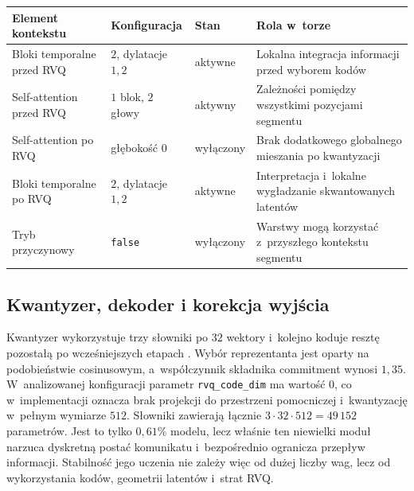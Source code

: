 \begin{center}
\centering
\small
\setlength{\tabcolsep}{4pt}
\begin{tabular}{>{\raggedright\arraybackslash}p{} >{\raggedright\arraybackslash}p{} >{\raggedright\arraybackslash}p{} >{\raggedright\arraybackslash}p{}}
\toprule
Element kontekstu & Konfiguracja & Stan & Rola w~torze \\
\midrule
Bloki temporalne przed RVQ & \(2\), dylatacje \(1,2\) & aktywne & Lokalna integracja informacji przed wyborem kodów \\
Self-attention przed RVQ & \(1\) blok, \(2\) głowy & aktywny & Zależności pomiędzy wszystkimi pozycjami segmentu \\
Self-attention po RVQ & głębokość \(0\) & wyłączony & Brak dodatkowego globalnego mieszania po kwantyzacji \\
Bloki temporalne po RVQ & \(2\), dylatacje \(1,2\) & aktywne & Interpretacja i~lokalne wygładzanie skwantowanych latentów \\
Tryb przyczynowy & \texttt{false} & wyłączony & Warstwy mogą korzystać z~przyszłego kontekstu segmentu \\
\bottomrule
\end{tabular}
\label{tab:kontekst-aktywnego-modelu}
\end{center}

\subsection{Kwantyzer, dekoder i korekcja wyjścia}
\label{subsec:kwantyzer-dekoder-korekcja}

Kwantyzer wykorzystuje trzy słowniki po \(32\) wektory i~kolejno koduje resztę pozostałą po wcześniejszych etapach \cite{Gray1984VectorQuantization,VanDenOord2017NeuralDiscrete,Zeghidour2021SoundStream}. Wybór reprezentanta jest oparty na podobieństwie cosinusowym, a~współczynnik składnika commitment wynosi \(1{,}35\). W~analizowanej konfiguracji parametr \texttt{rvq\_code\_dim} ma wartość \(0\), co w~implementacji oznacza brak projekcji do przestrzeni pomocniczej i~kwantyzację w~pełnym wymiarze \(512\). Słowniki zawierają łącznie \(3\cdot32\cdot512=49\,152\) parametrów. Jest to tylko \(0{,}61\%\) modelu, lecz właśnie ten niewielki moduł narzuca dyskretną postać komunikatu i~bezpośrednio ogranicza przepływ informacji. Stabilność jego uczenia nie zależy więc od dużej liczby wag, lecz od wykorzystania kodów, geometrii latentów i~strat RVQ.

